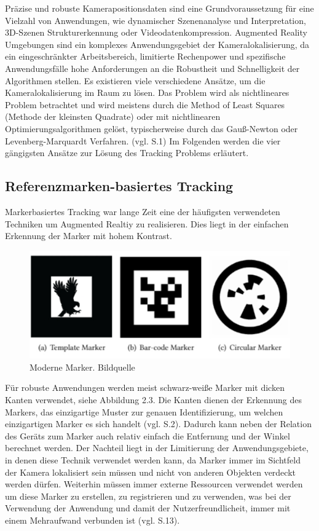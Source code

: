 Präzise und robuste Kamerapositionsdaten sind eine Grundvoraussetzung für eine Vielzahl von Anwendungen, wie dynamischer Szenenanalyse und Interpretation, 3D-Szenen Strukturerkennung oder Videodatenkompression. Augmented Reality Umgebungen sind ein komplexes Anwendungsgebiet der Kameralokalisierung, da ein eingeschränkter Arbeitsbereich, limitierte Rechenpower und spezifische Anwendungsfälle hohe Anforderungen an die Robustheit und Schnelligkeit der Algorithmen stellen. 
Es existieren viele verschiedene Ansätze, um die Kameralokalisierung im Raum zu lösen. Das Problem wird als nichtlineares Problem betrachtet und wird meistens durch die \glqq Method of Least Squares\grqq{} (Methode der kleinsten Quadrate) oder  mit nichtlinearen Optimierungsalgorithmen gelöst, typischerweise durch das Gauß-Newton oder Levenberg-Marquardt Verfahren. (vgl. \cite{camera_pose} S.1) Im Folgenden werden die vier gängigsten Ansätze zur Lösung des Tracking Problems erläutert. 


\subsection{Referenzmarken-basiertes Tracking}

Markerbasiertes Tracking war lange Zeit eine der häufigsten verwendeten Techniken um Augmented Realtiy zu realisieren. Dies liegt in der einfachen Erkennung der Marker mit hohem Kontrast.

\begin{figure}[H]
	\centering
	\includegraphics[scale=0.6]{markers.png}
	\caption{Moderne Marker. Bildquelle \cite{markers}}
\end{figure} 

Für robuste Anwendungen werden meist schwarz-weiße Marker mit dicken Kanten verwendet, siehe Abbildung 2.3. Die Kanten dienen der Erkennung des Markers, das einzigartige Muster zur genauen Identifizierung, um welchen einzigartigen Marker es sich handelt (vgl. \cite{markers} S.2). Dadurch kann neben der Relation des Geräts zum Marker auch relativ einfach die Entfernung und der Winkel berechnet werden. Der Nachteil liegt in der Limitierung der Anwendungsgebiete, in denen diese Technik verwendet werden kann, da Marker immer im Sichtfeld der Kamera lokalisiert sein müssen und nicht von anderen Objekten verdeckt werden dürfen. Weiterhin müssen immer externe Ressourcen verwendet werden um diese Marker zu erstellen, zu registrieren und zu verwenden, was bei der Verwendung der Anwendung und damit der Nutzerfreundlicheit, immer mit einem Mehraufwand verbunden ist (vgl. \cite{comparative_sdks} S.13).

